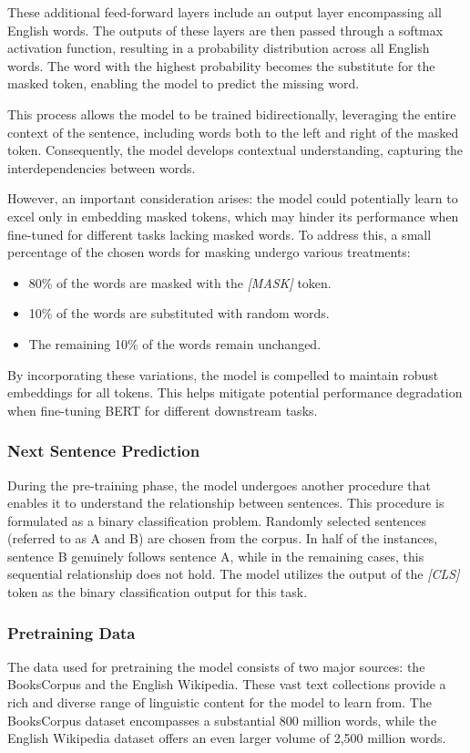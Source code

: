 \documentclass[a4paper,10pt]{report} %
\begin{document}
These additional feed-forward layers include an output layer encompassing all English words. The outputs of these layers are then passed through a softmax activation function, resulting in a probability distribution across all English words. The word with the highest probability becomes the substitute for the masked token, enabling the model to predict the missing word.

This process allows the model to be trained bidirectionally, leveraging the entire context of the sentence, including words both to the left and right of the masked token. Consequently, the model develops contextual understanding, capturing the interdependencies between words.

However, an important consideration arises: the model could potentially learn to excel only in embedding masked tokens, which may hinder its performance when fine-tuned for different tasks lacking masked words. To address this, a small percentage of the chosen words for masking undergo various treatments:

\begin{itemize}
  \item 80\% of the words are masked with the \textit{[MASK]} token.
  \item 10\% of the words are substituted with random words.
  \item The remaining 10\% of the words remain unchanged.
\end{itemize}

By incorporating these variations, the model is compelled to maintain robust embeddings for all tokens. This helps mitigate potential performance degradation when fine-tuning BERT for different downstream tasks.

\subsubsection{Next Sentence Prediction}
During the pre-training phase, the model undergoes another procedure that enables it to understand the relationship between sentences. This procedure is formulated as a binary classification problem. Randomly selected sentences (referred to as A and B) are chosen from the corpus. In half of the instances, sentence B genuinely follows sentence A, while in the remaining cases, this sequential relationship does not hold. The model utilizes the output of the \textit{[CLS]} token as the binary classification output for this task.

\subsubsection{Pretraining Data}
The data used for pretraining the model consists of two major sources: the BooksCorpus and the English Wikipedia. These vast text collections provide a rich and diverse range of linguistic content for the model to learn from. The BooksCorpus dataset encompasses a substantial 800 million words, while the English Wikipedia dataset offers an even larger volume of 2,500 million words. 
\end{document}
